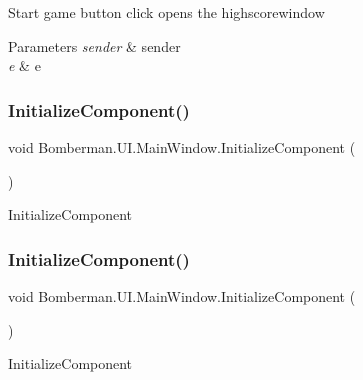 Start game button click opens the highscorewindow 


\begin{DoxyParams}{Parameters}
{\em sender} & sender\\
\hline
{\em e} & e\\
\hline
\end{DoxyParams}
\mbox{\label{class_bomberman_1_1_u_i_1_1_main_window_a0f7a080ed9fcbfcbada10623f1f64505}} 
\subsubsection{\texorpdfstring{InitializeComponent()}{InitializeComponent()}\hspace{0.1cm}{\footnotesize\ttfamily [1/2]}}
{\footnotesize\ttfamily void Bomberman.\+U\+I.\+Main\+Window.\+Initialize\+Component (\begin{DoxyParamCaption}{ }\end{DoxyParamCaption})\hspace{0.3cm}{\ttfamily [inline]}}



Initialize\+Component 

\mbox{\label{class_bomberman_1_1_u_i_1_1_main_window_a0f7a080ed9fcbfcbada10623f1f64505}} 
\subsubsection{\texorpdfstring{InitializeComponent()}{InitializeComponent()}\hspace{0.1cm}{\footnotesize\ttfamily [2/2]}}
{\footnotesize\ttfamily void Bomberman.\+U\+I.\+Main\+Window.\+Initialize\+Component (\begin{DoxyParamCaption}{ }\end{DoxyParamCaption})\hspace{0.3cm}{\ttfamily [inline]}}



Initialize\+Component 

